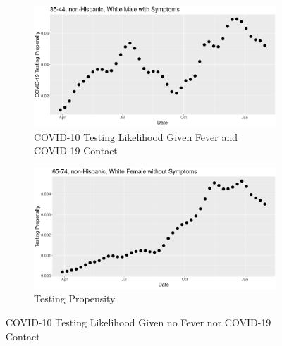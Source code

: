 \documentclass[11pt]{amsart}
\numberwithin{equation}{section}
\theoremstyle{plain}
\begin{document}
\begin{figure}[!th]
\centering
\begin{subfigure}{.5\textwidth}
 \centering
 \includegraphics[width=.9\linewidth]{../figs/tvprop_alt_fig1.png}
 \caption{COVID-10 Testing Likelihood Given Fever and COVID-19 Contact}
 \label{fig:testinglik1}
\end{subfigure}%
\begin{subfigure}{.5\textwidth}
 \centering
\includegraphics[width=.9\linewidth]{../figs/tvprop_alt_fig2.png}
 \caption{Testing Propensity}
 \label{fig:testinglik2}
\end{subfigure}
\caption{COVID-10 Testing Likelihood Given no Fever nor COVID-19 Contact}
\label{fig:testinglik}
\end{figure}
\end{document}
